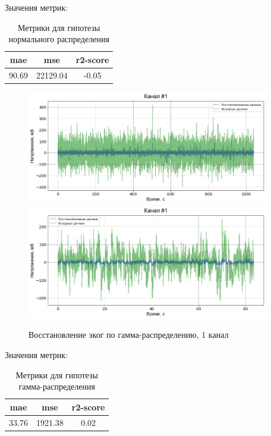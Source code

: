 \documentclass{mipt-thesis-bs}
\begin{document}
Значения метрик:
\begin{table}[h]
  
  \centering
    \begin{tabular}{ | c | c | c | }
	\hline
	mae & mse & r2-score \\ \hline
	90.69 & 22129.04 & -0.05 \\

	\hline
	\end{tabular}
\caption{Метрики для гипотезы нормального распределения}
\label{table:gauss mae}
\end{table}


\begin{figure}
\begin{center}
	\includegraphics[width=300pt,height=\textheight,keepaspectratio]{imgs/wishart_raw1.png}
	\includegraphics[width=300pt,height=\textheight,keepaspectratio]{imgs/wishart_raw1_80s.png}
	\caption{Восстановление эког по гамма-распределению, 1 канал}	
	\label{fig:gamma ecog}
	\end{center}
\end{figure}


Значения метрик:
\begin{table}[h]
  
  \centering
    \begin{tabular}{ | c | c | c | }
	\hline
	mae & mse & r2-score \\ \hline
	33.76 & 1921.38 & 0.02 \\

	\hline
	\end{tabular}
\caption{Метрики для гипотезы гамма-распределения}
\label{table:gauss mae}
\end{table}
\end{document}
